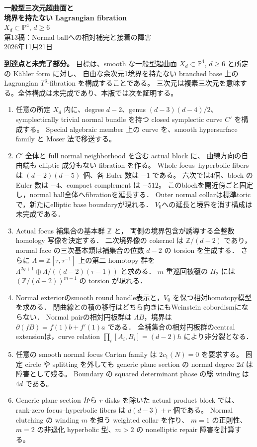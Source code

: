\documentclass[11pt,a4paper]{article}
\theoremstyle{definition}
\newcommand{\PP}{\mathbb P}
\begin{document}
\begin{center}
{\LARGE\sffamily\bfseries\color{ink}一般型三次元超曲面と\\[0.3em]
境界を持たない Lagrangian fibration}\\[0.8em]
{\large $X_d\subset\PP^4$, $d\ge6$}\\[0.45em]
{\small 第13稿：Normal ballへの相対補完と接着の障害}\\[0.6em]
2026年11月21日
\end{center}

\noindent\textbf{到達点と未完了部分。}
目標は、smooth な一般型超曲面 $X_d\subset\PP^4$, $d\ge6$ と所定の K\"ahler form に対し、
自由な余次元1境界を持たない branched base 上の Lagrangian $T^3$-fibration を構成することである。
三次元は複素三次元を意味する。全体構成は未完成であり、本版では次を証明する。
\begin{enumerate}[itemsep=0.25em,parsep=0pt]
\item 任意の所定 $X_d$ 内に、degree $d-2$、genus $(d-3)(d-4)/2$、
symplectically trivial normal bundle を持つ closed symplectic curve $C'$ を構成する。
Special algebraic member 上の curve を、smooth hypersurface family と Moser 法で移送する。
\item $C'$ 全体と full normal neighborhood を含む actual block に、
曲線方向の自由端も elliptic 成分もない fibration を作る。
Whole focus--hyperbolic fibers は $(d-2)(d-5)$ 個、各 Euler 数は $-1$ である。
六次では4個、block の Euler 数は $-4$、compact complement は $-512$。
このblockを開近傍ごと固定し，normal ball全体へfibrationを延長する．
Outer normal collarは標準toricで，新たにelliptic base boundaryが現れる．
$V_0$への延長と境界を消す構成は未完成である．
\item Actual focus 補集合の基本群 $\mathbb Z$ と，
両側の境界包含が誘導する全整数 homology 写像を決定する．
二次境界像の cokernel は $\mathbb Z/(d-2)$ であり，
normal face の三次基本類は補集合の位数 $d-2$ の torsion を生成する．
さらに $\Lambda=\mathbb Z[\tau,\tau^{-1}]$ 上の第二 homotopy 群を
$\Lambda^{2g+1}\oplus\Lambda/((d-2)(\tau-1))$ と求める．
$m$ 重巡回被覆の $H_2$ には $(\mathbb Z/(d-2))^{m-1}$ の torsion が現れる．
\item Normal exteriorのsmooth round handle表示と，$V_0$ を保つ相対homotopy模型を求める．
閉曲線との積の移行はどちら向きにもWeinstein cobordismにならない．
Normal pairの相対円板群は $\Lambda B$，境界は
$\partial(fB)=f(1)b+f'(1)a$ である．
全補集合の相対円板群のcentral extensionは，curve relation
$\prod_i[A_i,B_i]=(d-2)h$ により非分裂となる．
\item 任意の smooth normal focus Cartan family は $2c_1(N)=0$ を要求する。
固定 circle や splitting を外しても generic plane section の normal degree $2d$ は障害として残る。
Boundary の squared determinant phase の総 winding は $4d$ である。
\item Generic plane section から $r$ disks を除いた actual product block では、
rank-zero focus--hyperbolic fibers は $d(d-3)+r$ 個である。
Normal clutching の winding $m$ を担う weighted collar を作り、
$m=1$ の正則性、$m=2$ の非退化 hyperbolic 型、$m>2$ の nonelliptic repair 障害を計算する。
\end{enumerate}
\end{document}
